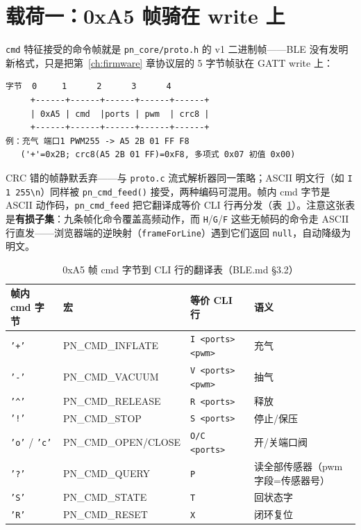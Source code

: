 \section{载荷一：0xA5 帧骑在 write 上}
\label{sec:ble-frame}

\texttt{cmd} 特征接受的命令帧就是 \texttt{pn\_core/proto.h} 的 v1 二进制帧——BLE 没有发明新格式，只是把第~\ref{ch:firmware} 章协议层的 5 字节帧驮在 GATT write 上：

\begin{lstlisting}[basicstyle=\small\ttfamily, breaklines=true,
  caption={cmd 写载荷（BLE.md \S4.1：5B，小端无关）}]
字节  0     1      2      3      4
     +------+------+------+------+------+
     | 0xA5 | cmd  |ports | pwm  | crc8 |
     +------+------+------+------+------+
例：充气 端口1 PWM255 -> A5 2B 01 FF F8
   ('+'=0x2B; crc8(A5 2B 01 FF)=0xF8, 多项式 0x07 初值 0x00)
\end{lstlisting}

CRC 错的帧静默丢弃——与 \texttt{proto.c} 流式解析器同一策略；ASCII 明文行（如 \texttt{I 1 255\textbackslash n}）同样被 \texttt{pn\_cmd\_feed()} 接受，两种编码可混用。帧内 cmd 字节是 ASCII 动作码，\texttt{pn\_cmd\_feed} 把它翻译成等价 CLI 行再分发（表~\ref{tab:ble-translate}）。注意这张表是\textbf{有损子集}：九条帧化命令覆盖高频动作，而 \texttt{H}/\texttt{G}/\texttt{F} 这些无帧码的命令走 ASCII 行直发——浏览器端的逆映射（\texttt{frameForLine}）遇到它们返回 \texttt{null}，自动降级为明文。

\begin{table}[htbp]
  \centering
  \caption{0xA5 帧 cmd 字节到 CLI 行的翻译表（BLE.md \S3.2）}
  \label{tab:ble-translate}
  \begin{tabular}{llll}
    \toprule
    帧内 cmd 字节 & 宏 & 等价 CLI 行 & 语义 \\
    \midrule
    \texttt{'+'} & PN\_CMD\_INFLATE & \texttt{I <ports> <pwm>} & 充气 \\
    \texttt{'-'} & PN\_CMD\_VACUUM & \texttt{V <ports> <pwm>} & 抽气 \\
    \texttt{'\^{}'} & PN\_CMD\_RELEASE & \texttt{R <ports>} & 释放 \\
    \texttt{'!'} & PN\_CMD\_STOP & \texttt{S <ports>} & 停止/保压 \\
    \texttt{'o'} / \texttt{'c'} & PN\_CMD\_OPEN/CLOSE & \texttt{O/C <ports>} & 开/关端口阀 \\
    \texttt{'?'} & PN\_CMD\_QUERY & \texttt{P} & 读全部传感器（pwm 字段=传感器号） \\
    \texttt{'S'} & PN\_CMD\_STATE & \texttt{T} & 回状态字 \\
    \texttt{'R'} & PN\_CMD\_RESET & \texttt{X} & 闭环复位 \\
    \bottomrule
  \end{tabular}
\end{table}

